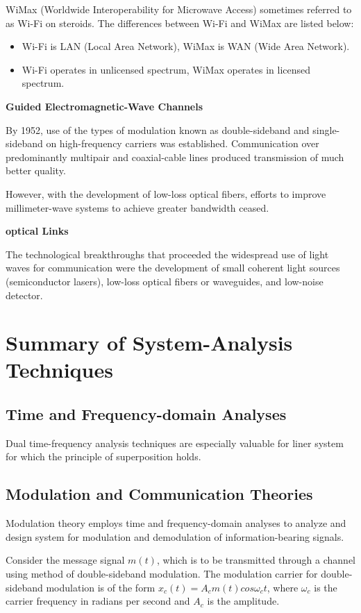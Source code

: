 \documentclass[12pt,a4paper]{book}
\begin{document}
WiMax (Worldwide Interoperability for Microwave Access) sometimes referred to as Wi-Fi on steroids.
The differences between Wi-Fi and WiMax are listed below:
\begin{itemize}
  \item Wi-Fi is LAN (Local Area Network), WiMax is WAN (Wide Area Network).
  \item Wi-Fi operates in unlicensed spectrum, WiMax operates in licensed spectrum.
\end{itemize}

\textbf{Guided Electromagnetic-Wave Channels}

By 1952, use of the types of modulation known as double-sideband and single-sideband on high-frequency carriers was established. Communication over predominantly multipair and coaxial-cable lines produced transmission of much better quality.

However, with the development of low-loss optical fibers, efforts to improve millimeter-wave systems to achieve greater bandwidth ceased.

\textbf{optical Links}

The technological breakthroughs that proceeded the widespread use of light waves for communication were the development of small coherent light sources (semiconductor lasers), low-loss optical fibers or waveguides, and low-noise detector.

\section{Summary of System-Analysis Techniques}
\subsection{Time and Frequency-domain Analyses}

Dual time-frequency analysis techniques are especially valuable for liner system for which the principle of superposition holds.

\subsection{Modulation and Communication Theories}

Modulation theory employs time and frequency-domain analyses to analyze and design system for modulation and demodulation
of information-bearing signals.

Consider the message signal $m(t)$, which is to be transmitted through a channel using method of double-sideband modulation.
The modulation carrier for double-sideband modulation is of the form $x_c(t) = A_cm(t)cos\omega_ct$, where $\omega_c$ is the carrier frequency in radians per second and $A_c$ is the amplitude.
\end{document}
